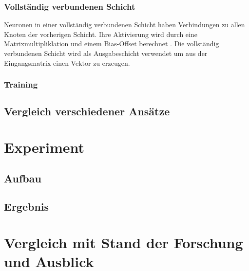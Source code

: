 \documentclass[twosided,a4,10pt]{article}
\begin{document}
\begin{multicols}{2}
\subsubsection*{Vollständig verbundenen Schicht}
Neuronen in einer vollständig verbundenen Schicht haben Verbindungen zu allen Knoten der vorherigen Schicht. Ihre Aktivierung wird durch eine Matrixmultipliklation und einem Bias-Offset berechnet \cite{karpathy}. Die vollständig verbundenen Schicht wird als Ausgabeschicht verwendet um aus der Eingangsmatrix einen Vektor zu erzeugen.

\subsubsection*{Training}

\subsection{Vergleich verschiedener Ansätze}

\section{Experiment}

\subsection{Aufbau}

\subsection{Ergebnis}

\section{Vergleich mit Stand der Forschung und Ausblick}

%



\end{multicols}
\end{document}

